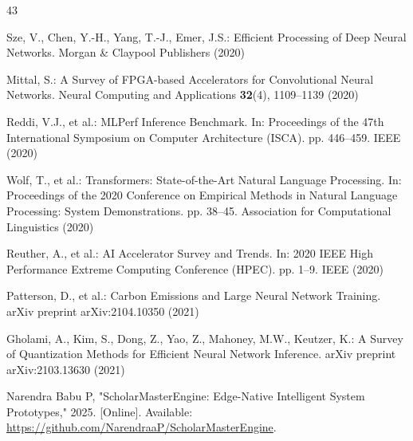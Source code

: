 \documentclass[conference]{IEEEtran}
\begin{document}
\begin{thebibliography}{43}

Sze, V., Chen, Y.-H., Yang, T.-J., Emer, J.S.: Efficient Processing of Deep Neural Networks. Morgan \& Claypool Publishers (2020)


Mittal, S.: A Survey of FPGA-based Accelerators for Convolutional Neural Networks. Neural Computing and Applications \textbf{32}(4), 1109--1139 (2020)


Reddi, V.J., et al.: MLPerf Inference Benchmark. In: Proceedings of the 47th International Symposium on Computer Architecture (ISCA). pp. 446--459. IEEE (2020)


Wolf, T., et al.: Transformers: State-of-the-Art Natural Language Processing. In: Proceedings of the 2020 Conference on Empirical Methods in Natural Language Processing: System Demonstrations. pp. 38--45. Association for Computational Linguistics (2020)


Reuther, A., et al.: AI Accelerator Survey and Trends. In: 2020 IEEE High Performance Extreme Computing Conference (HPEC). pp. 1--9. IEEE (2020)


Patterson, D., et al.: Carbon Emissions and Large Neural Network Training. arXiv preprint arXiv:2104.10350 (2021)


Gholami, A., Kim, S., Dong, Z., Yao, Z., Mahoney, M.W., Keutzer, K.: A Survey of Quantization Methods for Efficient Neural Network Inference. arXiv preprint arXiv:2103.13630 (2021)


Narendra Babu P, "ScholarMasterEngine: Edge-Native Intelligent System Prototypes," 2025. [Online]. Available: \url{https://github.com/NarendraaP/ScholarMasterEngine}.

\end{thebibliography}
\end{document}
